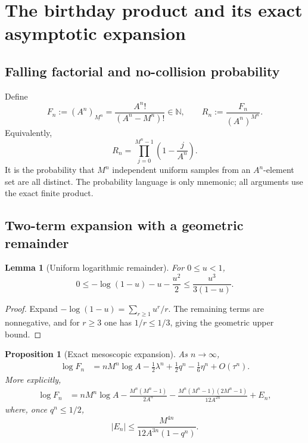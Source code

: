 \documentclass[11pt,oneside]{article}
\newtheorem{proposition}[theorem]{Proposition}
\newtheorem{lemma}[theorem]{Lemma}
\theoremstyle{definition}
\theoremstyle{remark}
\newcommand{\N}{\mathbb N}
\newcommand{\fall}[2]{\left(#1\right)_{\!\underline{#2}}}
\begin{document}
\section{The birthday product and its exact asymptotic expansion}
\label{sec:birthday}

\subsection{Falling factorial and no-collision probability}

Define
\begin{equation}
 F_n:=\fall{A^n}{M^n}
 =\frac{A^n!}{(A^n-M^n)!}\in\N,
 \qquad
 R_n:=\frac{F_n}{(A^n)^{M^n}}.
 \label{eq:Fn-Rn}
\end{equation}
Equivalently,
\begin{equation}
 R_n=\prod_{j=0}^{M^n-1}\left(1-\frac{j}{A^n}\right).
 \label{eq:R-product}
\end{equation}
It is the probability that $M^n$ independent uniform samples from an $A^n$-element set are
all distinct.  The probability language is only mnemonic; all arguments use the exact
finite product.

\subsection{Two-term expansion with a geometric remainder}

\begin{lemma}[Uniform logarithmic remainder]
\label{lem:log-remainder}
For $0\le u<1$,
\begin{equation}
 0\le -\log(1-u)-u-\frac{u^2}{2}
 \le \frac{u^3}{3(1-u)}.
 \label{eq:log-remainder}
\end{equation}
\end{lemma}

\begin{proof}
Expand $-\log(1-u)=\sum_{r\ge1}u^r/r$.  The remaining terms are nonnegative, and for
$r\ge3$ one has $1/r\le1/3$, giving the geometric upper bound.
\end{proof}

\begin{proposition}[Exact mesoscopic expansion]
\label{prop:Fn-expansion}
As $n\to\infty$,
\begin{align}
 \log F_n
 &=nM^n\log A
   -\frac12\lambda^n
   +\frac12q^n
   -\frac16\eta^n
   +O(\tau^n).
 \label{eq:Fn-expansion}
\end{align}
More explicitly,
\begin{align}
 \log F_n
 &=nM^n\log A
 -\frac{M^n(M^n-1)}{2A^n}
 -\frac{M^n(M^n-1)(2M^n-1)}{12A^{2n}}
 +E_n,
 \label{eq:Fn-expansion-exact}
\end{align}
where, once $q^n\le1/2$,
\begin{equation}
 |E_n|\le
 \frac{M^{4n}}{12A^{3n}(1-q^n)}.
 \label{eq:En-bound}
\end{equation}
\end{proposition}
\end{document}
